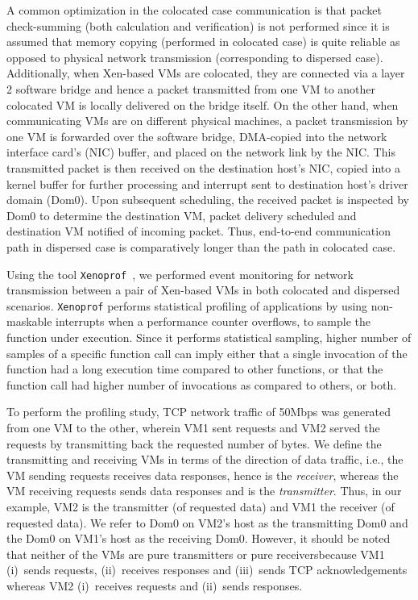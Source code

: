 A common optimization in the colocated case communication is that 
packet check-summing
(both calculation and verification) is not performed since it is assumed 
that memory copying (performed in colocated case) is quite reliable as 
opposed to physical network transmission (corresponding to dispersed case). 
Additionally, when Xen-based VMs are colocated, they are
connected via a layer 2 software bridge and hence a packet 
transmitted from one VM to another colocated VM is locally delivered 
on the bridge itself. On the other hand, when communicating VMs 
are on different physical machines, a packet transmission by one VM
is forwarded over the software bridge, 
DMA-copied
into the network interface 
card's (NIC) 
buffer, and placed on the network link by the NIC. This
transmitted packet is then received on the destination host's NIC, 
copied into a kernel buffer for further processing
and interrupt sent to destination host's driver domain (Dom0). Upon
subsequent scheduling, the received packet is inspected by Dom0 to
determine the destination VM, packet delivery scheduled and destination 
VM notified of incoming packet. Thus, end-to-end communication
path in dispersed case is comparatively longer than the path 
in colocated case.

Using the tool \texttt{Xenoprof}~\cite{xenoprof}, we performed
event monitoring for network transmission between a pair of Xen-based 
VMs in both colocated and dispersed scenarios. 
\texttt{Xenoprof} performs statistical profiling of applications
by using non-maskable interrupts when a performance counter overflows,
to sample the function under execution. Since it
performs statistical sampling, higher number of samples 
of a specific function call can imply either that a
single invocation of the function had a long execution 
time compared to other functions, 
or that the function call had higher
number of invocations as compared to others, or both.

To perform the profiling study, 
TCP
network traffic of
50Mbps was generated from one VM to the other,
wherein VM1 sent requests and VM2 served the requests
by transmitting back the requested number of bytes. 
We define the transmitting and receiving VMs in terms of 
the direction of data traffic,
i.e., the VM sending requests receives data responses, 
hence is the \emph{receiver},
whereas the VM receiving requests sends data responses and 
is the \emph{transmitter}.
Thus, in our example, VM2 is the transmitter (of requested data) and 
VM1 the receiver (of requested data). 
We refer to Dom0 on VM2's host as the transmitting Dom0 
and the Dom0 on VM1's host as the receiving Dom0. However, it
should be noted that neither of the VMs are pure transmitters
or pure receivers\textemdash{}because VM1 (i)~sends requests, (ii)~receives responses 
and (iii)~sends TCP acknowledgements whereas VM2 (i)~receives requests and
(ii)~sends responses.


